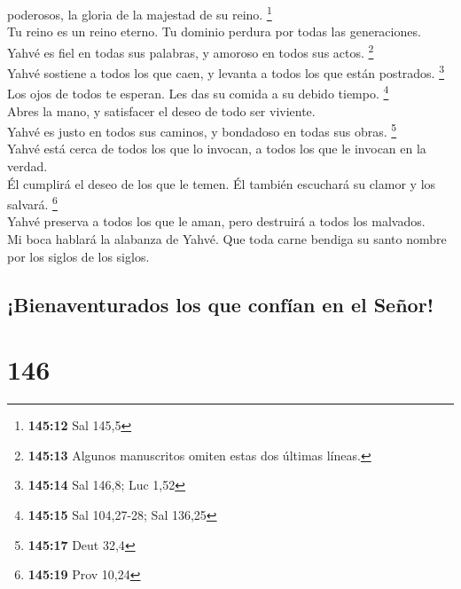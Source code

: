 poderosos, la gloria de la majestad de su reino. \footnote{\textbf{145:12}
  Sal 145,5}\\
 Tu reino es un reino eterno. Tu dominio perdura por
todas las generaciones. Yahvé es fiel en todas sus palabras, y amoroso
en todos sus actos. \footnote{\textbf{145:13} Algunos manuscritos omiten
  estas dos últimas líneas.}\\
 Yahvé sostiene a todos los que caen, y levanta a todos
los que están postrados. \footnote{\textbf{145:14} Sal 146,8; Luc 1,52}\\
 Los ojos de todos te esperan. Les das su comida a su
debido tiempo. \footnote{\textbf{145:15} Sal 104,27-28; Sal 136,25}\\
 Abres la mano, y satisfacer el deseo de todo ser
viviente.\\
 Yahvé es justo en todos sus caminos, y bondadoso en
todas sus obras. \footnote{\textbf{145:17} Deut 32,4}\\
 Yahvé está cerca de todos los que lo invocan, a todos
los que le invocan en la verdad.\\
 Él cumplirá el deseo de los que le temen. Él también
escuchará su clamor y los salvará. \footnote{\textbf{145:19} Prov 10,24}\\
 Yahvé preserva a todos los que le aman, pero destruirá a
todos los malvados.\\
 Mi boca hablará la alabanza de Yahvé. Que toda carne
bendiga su santo nombre por los siglos de los siglos.

\hypertarget{bienaventurados-los-que-confuxedan-en-el-seuxf1or}{%
\subsection{¡Bienaventurados los que confían en el
Señor!}\label{bienaventurados-los-que-confuxedan-en-el-seuxf1or}}

\hypertarget{section-143}{%
\section{146}\label{section-143}}

